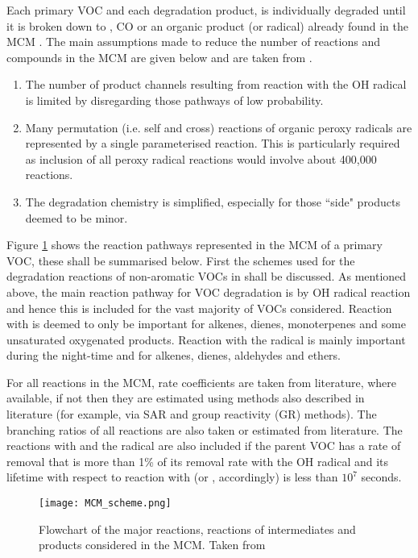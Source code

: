 Each primary VOC and each degradation product, is individually degraded until it is broken down to , CO or an organic product (or radical) already found in the MCM \citep{Jenkin:1997}. 
The main assumptions made to reduce the number of reactions and compounds in the MCM are given below and are taken from \citep{Jenkin:1997}.
\begin{enumerate}
    \item The number of product channels resulting from reaction with the OH radical is limited by disregarding those pathways of low probability.
    \item Many permutation (i.e. self and cross) reactions of organic peroxy radicals are represented by a single parameterised reaction. This is particularly required as inclusion of all peroxy radical reactions would involve about 400,000 reactions.
    \item The degradation chemistry is simplified, especially for those ``side" products deemed to be minor.
\end{enumerate}
Figure \ref{f:MCM_scheme} shows the reaction pathways represented in the MCM of a primary VOC, these shall be summarised below.
First the schemes used for the degradation reactions of non-aromatic VOCs in \citep{Saunders:2003} shall be discussed. 
As mentioned above, the main reaction pathway for VOC degradation is by OH radical reaction and hence this is included for the vast majority of VOCs considered. 
Reaction with  is deemed to only be important for alkenes, dienes, monoterpenes and some unsaturated oxygenated products. 
Reaction with the  radical is mainly important during the night-time and for alkenes, dienes, aldehydes and ethers.  

For all reactions in the MCM, rate coefficients are taken from literature, where available, if not then they are estimated using methods also described in literature (for example, via SAR and group reactivity (GR) methods). 
The branching ratios of all reactions are also taken or estimated from literature. 
The reactions with  and the  radical are also included if the parent VOC has a rate of removal that is more than 1\% of its removal rate with the OH radical and its lifetime with respect to reaction with  (or , accordingly) is less than $10^7$ seconds.
\begin{figure}
    \begin{center}
        \texttt{[image: MCM\_scheme.png]}
        \caption{Flowchart of the major reactions, reactions of intermediates and products considered in the MCM. Taken from \citep{Saunders:2003}}
        \label{f:MCM_scheme}
    \end{center}
\end{figure}

